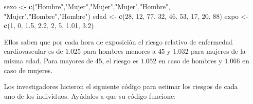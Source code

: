 \documentclass[
]{book}
\newenvironment{Shaded}{\begin{snugshade}}{\end{snugshade}}
\newcommand{\DecValTok}[1]{\textcolor[rgb]{0.00,0.00,0.81}{#1}}
\newcommand{\FloatTok}[1]{\textcolor[rgb]{0.00,0.00,0.81}{#1}}
\newcommand{\KeywordTok}[1]{\textcolor[rgb]{0.13,0.29,0.53}{\textbf{#1}}}
\newcommand{\NormalTok}[1]{#1}
\newcommand{\StringTok}[1]{\textcolor[rgb]{0.31,0.60,0.02}{#1}}
\begin{document}
\begin{Shaded}
\begin{Highlighting}[]
\NormalTok{sexo <-}\StringTok{ }\KeywordTok{c}\NormalTok{(}\StringTok{"Hombre"}\NormalTok{,}\StringTok{"Mujer"}\NormalTok{,}\StringTok{"Mujer"}\NormalTok{,}\StringTok{"Mujer"}\NormalTok{,}\StringTok{"Hombre"}\NormalTok{,}
          \StringTok{"Mujer"}\NormalTok{,}\StringTok{"Hombre"}\NormalTok{,}\StringTok{"Hombre"}\NormalTok{)}
\NormalTok{edad <-}\StringTok{ }\KeywordTok{c}\NormalTok{(}\DecValTok{28}\NormalTok{, }\DecValTok{12}\NormalTok{, }\DecValTok{77}\NormalTok{, }\DecValTok{32}\NormalTok{, }\DecValTok{46}\NormalTok{, }\DecValTok{53}\NormalTok{, }\DecValTok{17}\NormalTok{, }\DecValTok{20}\NormalTok{, }\DecValTok{88}\NormalTok{)}
\NormalTok{expo  <-}\StringTok{ }\KeywordTok{c}\NormalTok{(}\DecValTok{1}\NormalTok{, }\DecValTok{0}\NormalTok{, }\FloatTok{1.5}\NormalTok{, }\FloatTok{2.2}\NormalTok{, }\DecValTok{2}\NormalTok{, }\DecValTok{5}\NormalTok{, }\FloatTok{1.01}\NormalTok{, }\FloatTok{3.2}\NormalTok{)}
\end{Highlighting}
\end{Shaded}

Ellos saben que por cada hora de exposición el riesgo relativo de enfermedad cardiovascular es de \(1.025\) para hombres menores a 45 y \(1.032\) para mujeres de la misma edad. Para mayores de 45, el riesgo es \(1.052\) en caso de hombres y \(1.066\) en caso de mujeres.

Los investigadores hicieron el siguiente código para estimar los riesgos de cada uno de los individuos. Ayúdalos a que su código funcione:
\end{document}
